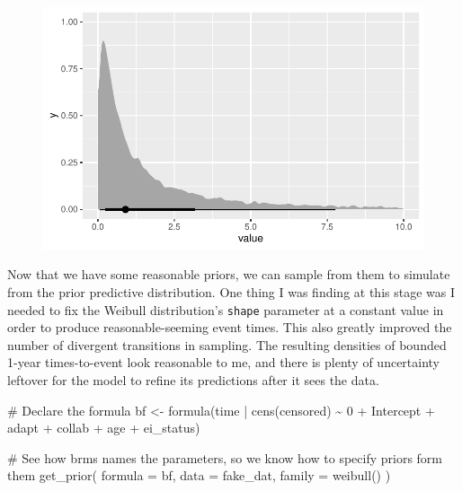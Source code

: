 \documentclass[
  letterpaper,
  DIV=11,
  numbers=noendperiod]{scrreprt}
\newenvironment{Shaded}{\begin{snugshade}}{\end{snugshade}}
\newcommand{\AttributeTok}[1]{\textcolor[rgb]{0.40,0.45,0.13}{#1}}
\newcommand{\CommentTok}[1]{\textcolor[rgb]{0.37,0.37,0.37}{#1}}
\newcommand{\DecValTok}[1]{\textcolor[rgb]{0.68,0.00,0.00}{#1}}
\newcommand{\FunctionTok}[1]{\textcolor[rgb]{0.28,0.35,0.67}{#1}}
\newcommand{\NormalTok}[1]{\textcolor[rgb]{0.00,0.23,0.31}{#1}}
\newcommand{\OtherTok}[1]{\textcolor[rgb]{0.00,0.23,0.31}{#1}}
\newcommand{\SpecialCharTok}[1]{\textcolor[rgb]{0.37,0.37,0.37}{#1}}
\begin{document}
\begin{figure}[H]

{\centering \includegraphics{./bayesian-cfa_files/figure-pdf/unnamed-chunk-25-1.pdf}

}

\end{figure}

Now that we have some reasonable priors, we can sample from them to
simulate from the prior predictive distribution. One thing I was finding
at this stage was I needed to fix the Weibull distribution's
\texttt{shape} parameter at a constant value in order to produce
reasonable-seeming event times. This also greatly improved the number of
divergent transitions in sampling. The resulting densities of bounded
1-year times-to-event look reasonable to me, and there is plenty of
uncertainty leftover for the model to refine its predictions after it
sees the data.

\begin{Shaded}
\begin{Highlighting}[]
\CommentTok{\# Declare the formula}
\NormalTok{bf }\OtherTok{\textless{}{-}} \FunctionTok{formula}\NormalTok{(time }\SpecialCharTok{|} \FunctionTok{cens}\NormalTok{(censored) }\SpecialCharTok{\textasciitilde{}} \DecValTok{0} \SpecialCharTok{+}\NormalTok{ Intercept }\SpecialCharTok{+}\NormalTok{ adapt }\SpecialCharTok{+}\NormalTok{ collab }\SpecialCharTok{+}\NormalTok{ age }\SpecialCharTok{+}\NormalTok{ ei\_status)}

\CommentTok{\# See how brms names the parameters, so we know how to specify priors form them}
\FunctionTok{get\_prior}\NormalTok{(}
  \AttributeTok{formula =}\NormalTok{ bf,}
  \AttributeTok{data =}\NormalTok{ fake\_dat,}
  \AttributeTok{family =} \FunctionTok{weibull}\NormalTok{()}
\NormalTok{)}
\end{Highlighting}
\end{Shaded}
\end{document}
